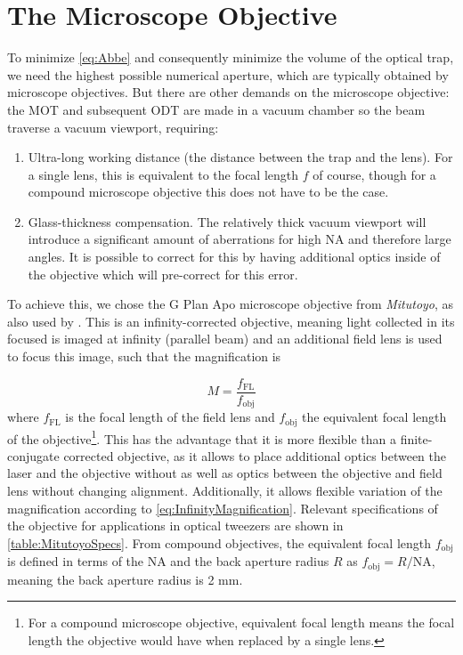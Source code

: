 \section{The Microscope Objective}\label{sec:TweezersPractice}

To minimize \cref{eq:Abbe} and consequently minimize the volume of the optical trap, we need the highest possible numerical aperture, which are typically obtained by microscope objectives. 
But there are other demands on the microscope objective: the \ac{MOT} and subsequent \ac{ODT} are made in a vacuum chamber so the beam traverse a vacuum viewport, requiring:

\begin{enumerate}
    \item Ultra-long working distance (the distance between the trap and the lens). For a single lens, this is equivalent to the focal length $f$ of course, though for a compound microscope objective this does not have to be the case.
    
    \item Glass-thickness compensation. The relatively thick vacuum viewport will introduce a significant amount of aberrations for high NA and therefore large angles. It is possible to correct for this by having additional optics inside of the objective which will pre-correct for this error.
\end{enumerate}
To achieve this, we chose the G Plan Apo microscope objective from \textit{Mitutoyo}, as also used by \cite{Manuel2016,Ebadi2021}. 
This is an infinity-corrected objective, meaning light collected in its focused is imaged at infinity (parallel beam) and an additional field lens is used to focus this image, such that the magnification is 

\begin{equation}\label{eq:InfinityMagnification}
    M = \frac{
    f_{\text{FL}}
    }{
    f_{\text{obj}}
    }
\end{equation}
where $f_{\text{FL}}$ is the focal length of the field lens and $f_{\text{obj}}$ the equivalent focal length of the objective\footnote{For a compound microscope objective, equivalent focal length means the focal length the objective would have when replaced by a single lens.}.
This has the advantage that it is more flexible than a finite-conjugate corrected objective, as it allows to place additional optics between the laser and the objective without as well as optics between the objective and field lens without changing alignment.
Additionally, it allows flexible variation of the magnification according to \cref{eq:InfinityMagnification}.
Relevant specifications of the objective for applications in optical tweezers are shown in \cref{table:MitutoyoSpecs}. 
From compound objectives, the equivalent focal length $f_{\text{obj}}$ is defined in terms of the \ac{NA} and the back aperture radius $R$ as $f_{\text{obj}} = R / \text{NA}$, meaning the back aperture radius is 2 mm.

